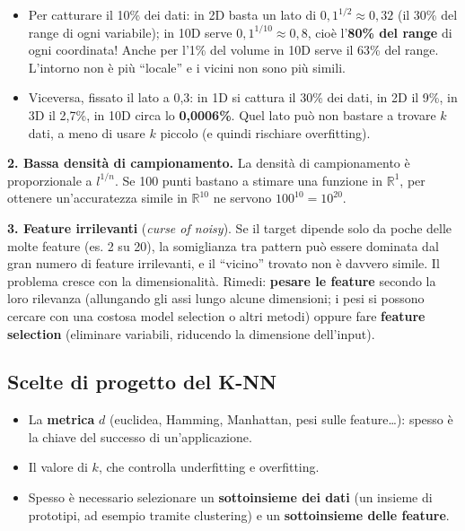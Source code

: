 \begin{itemize}
\tightlist
\item
  Per catturare il 10\% dei dati: in 2D basta un lato di
  \(0{,}1^{1/2} \approx 0{,}32\) (il 30\% del range di ogni variabile);
  in 10D serve \(0{,}1^{1/10} \approx 0{,}8\), cioè l'\textbf{80\% del
  range} di ogni coordinata! Anche per l'1\% del volume in 10D serve il
  63\% del range. L'intorno non è più ``locale'' e i vicini non sono più
  simili.
\item
  Viceversa, fissato il lato a 0,3: in 1D si cattura il 30\% dei dati,
  in 2D il 9\%, in 3D il 2,7\%, in 10D circa lo \textbf{0,0006\%}. Quel
  lato può non bastare a trovare \(k\) dati, a meno di usare \(k\)
  piccolo (e quindi rischiare overfitting).
\end{itemize}

\textbf{2. Bassa densità di campionamento.} La densità di campionamento
è proporzionale a \(l^{1/n}\). Se 100 punti bastano a stimare una
funzione in \(\mathbb{R}^1\), per ottenere un'accuratezza simile in
\(\mathbb{R}^{10}\) ne servono \(100^{10} = 10^{20}\).

\textbf{3. Feature irrilevanti} (\emph{curse of noisy}). Se il target
dipende solo da poche delle molte feature (es. 2 su 20), la somiglianza
tra pattern può essere dominata dal gran numero di feature irrilevanti,
e il ``vicino'' trovato non è davvero simile. Il problema cresce con la
dimensionalità. Rimedi: \textbf{pesare le feature} secondo la loro
rilevanza (allungando gli assi lungo alcune dimensioni; i pesi si
possono cercare con una costosa model selection o altri metodi) oppure
fare \textbf{feature selection} (eliminare variabili, riducendo la
dimensione dell'input).

\subsection{Scelte di progetto del
K-NN}\label{scelte-di-progetto-del-k-nn}

\begin{itemize}
\tightlist
\item
  La \textbf{metrica} \(d\) (euclidea, Hamming, Manhattan, pesi sulle
  feature\ldots): spesso è la chiave del successo di un'applicazione.
\item
  Il valore di \textbf{\(k\)}, che controlla underfitting e overfitting.
\item
  Spesso è necessario selezionare un \textbf{sottoinsieme dei dati} (un
  insieme di prototipi, ad esempio tramite clustering) e un
  \textbf{sottoinsieme delle feature}.
\end{itemize}

